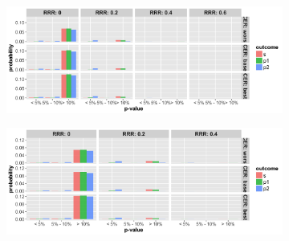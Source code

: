 \documentclass[]{article}
\begin{document}
\begin{figure}
\centering
  \caption{Probability that the p-value (from Fisher’s exact test) at termination of the trial is below 5\%, between 5\%
  and 10\% and greater than 10\% for cases where trial was stopped for futility of (a) B.I or (b) L.P.  The rows
  represent the three control even rate scenarios and the four columns present four relative risk reduction scenarios.
  Note: In the figures below, the denominator in each figure is the number of simulations (not the number of trials
  stopped for futility or superiority, and thus, the proportions do not add up to 100\% within one figure. Further, the
  figures do not include simulations where the trial went to the maximum allowed sample size. The bars should be
  interpreted with respect to the relative proportion that fit in each category.}
  \begin{subfigure}{0.8\textwidth}
    \centering
    \caption{}
    \includegraphics{../plots/3arm/p_value_futbi_3arm.png}
  \end{subfigure}
  \bigbreak
  \begin{subfigure}{0.8\textwidth}
    \centering
    \caption{}
    \includegraphics{../plots/3arm/p_value_futlp_3arm.png}
  \end{subfigure}
\end{figure}
\end{document}
